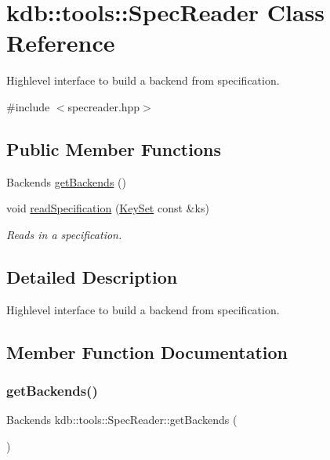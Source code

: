 \hypertarget{classkdb_1_1tools_1_1SpecReader}{}\section{kdb\+:\+:tools\+:\+:Spec\+Reader Class Reference}
\label{classkdb_1_1tools_1_1SpecReader}


Highlevel interface to build a backend from specification.  




{\ttfamily \#include $<$specreader.\+hpp$>$}

\subsection*{Public Member Functions}
\begin{DoxyCompactItemize}
\item 
Backends \hyperlink{classkdb_1_1tools_1_1SpecReader_a0a1b4d2b7267d1dd4452f08fd898f0fd}{get\+Backends} ()
\item 
void \hyperlink{classkdb_1_1tools_1_1SpecReader_af0c638ed8094ebf3a5b4e028bbe2c38b}{read\+Specification} (\hyperlink{classkdb_1_1KeySet}{Key\+Set} const \&ks)
\begin{DoxyCompactList}\small\item\em Reads in a specification. \end{DoxyCompactList}\end{DoxyCompactItemize}


\subsection{Detailed Description}
Highlevel interface to build a backend from specification. 

\subsection{Member Function Documentation}
\mbox{\label{classkdb_1_1tools_1_1SpecReader_a0a1b4d2b7267d1dd4452f08fd898f0fd}} 
\subsubsection{\texorpdfstring{get\+Backends()}{getBackends()}}
{\footnotesize\ttfamily Backends kdb\+::tools\+::\+Spec\+Reader\+::get\+Backends (\begin{DoxyParamCaption}{ }\end{DoxyParamCaption})\hspace{0.3cm}{\ttfamily [inline]}}

